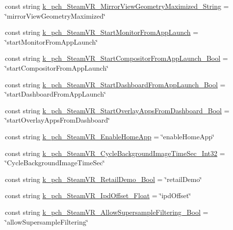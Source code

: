 \begin{DoxyCompactItemize}
\item 
const string \mbox{\hyperlink{class_valve_1_1_v_r_1_1_open_v_r_a7f23a20202205e8f06789d936b1bf976}{k\+\_\+pch\+\_\+\+Steam\+V\+R\+\_\+\+Mirror\+View\+Geometry\+Maximized\+\_\+\+String}} = \char`\"{}mirror\+View\+Geometry\+Maximized\char`\"{}
\item 
const string \mbox{\hyperlink{class_valve_1_1_v_r_1_1_open_v_r_a496fbeb3f7d3e19b1089787351865b64}{k\+\_\+pch\+\_\+\+Steam\+V\+R\+\_\+\+Start\+Monitor\+From\+App\+Launch}} = \char`\"{}start\+Monitor\+From\+App\+Launch\char`\"{}
\item 
const string \mbox{\hyperlink{class_valve_1_1_v_r_1_1_open_v_r_a62a2d32a9eec7ddec666034a4d7075d6}{k\+\_\+pch\+\_\+\+Steam\+V\+R\+\_\+\+Start\+Compositor\+From\+App\+Launch\+\_\+\+Bool}} = \char`\"{}start\+Compositor\+From\+App\+Launch\char`\"{}
\item 
const string \mbox{\hyperlink{class_valve_1_1_v_r_1_1_open_v_r_a8dd7da75e051369b539bbd43e8223f1f}{k\+\_\+pch\+\_\+\+Steam\+V\+R\+\_\+\+Start\+Dashboard\+From\+App\+Launch\+\_\+\+Bool}} = \char`\"{}start\+Dashboard\+From\+App\+Launch\char`\"{}
\item 
const string \mbox{\hyperlink{class_valve_1_1_v_r_1_1_open_v_r_aa674c9c2a3cd4fe29264f3b01cda14a9}{k\+\_\+pch\+\_\+\+Steam\+V\+R\+\_\+\+Start\+Overlay\+Apps\+From\+Dashboard\+\_\+\+Bool}} = \char`\"{}start\+Overlay\+Apps\+From\+Dashboard\char`\"{}
\item 
const string \mbox{\hyperlink{class_valve_1_1_v_r_1_1_open_v_r_a5ea0a3958caee141d772776eb52cf410}{k\+\_\+pch\+\_\+\+Steam\+V\+R\+\_\+\+Enable\+Home\+App}} = \char`\"{}enable\+Home\+App\char`\"{}
\item 
const string \mbox{\hyperlink{class_valve_1_1_v_r_1_1_open_v_r_a987a0154eb5626e58e4b4e912506779b}{k\+\_\+pch\+\_\+\+Steam\+V\+R\+\_\+\+Cycle\+Background\+Image\+Time\+Sec\+\_\+\+Int32}} = \char`\"{}Cycle\+Background\+Image\+Time\+Sec\char`\"{}
\item 
const string \mbox{\hyperlink{class_valve_1_1_v_r_1_1_open_v_r_a0468a723de378ca8d0c2b804a10927ad}{k\+\_\+pch\+\_\+\+Steam\+V\+R\+\_\+\+Retail\+Demo\+\_\+\+Bool}} = \char`\"{}retail\+Demo\char`\"{}
\item 
const string \mbox{\hyperlink{class_valve_1_1_v_r_1_1_open_v_r_a081d8b0f03a7d8a8105026ba4630090d}{k\+\_\+pch\+\_\+\+Steam\+V\+R\+\_\+\+Ipd\+Offset\+\_\+\+Float}} = \char`\"{}ipd\+Offset\char`\"{}
\item 
const string \mbox{\hyperlink{class_valve_1_1_v_r_1_1_open_v_r_ad3752c36288e920a3860d125fddcbb3a}{k\+\_\+pch\+\_\+\+Steam\+V\+R\+\_\+\+Allow\+Supersample\+Filtering\+\_\+\+Bool}} = \char`\"{}allow\+Supersample\+Filtering\char`\"{}

\end{DoxyCompactItemize}
